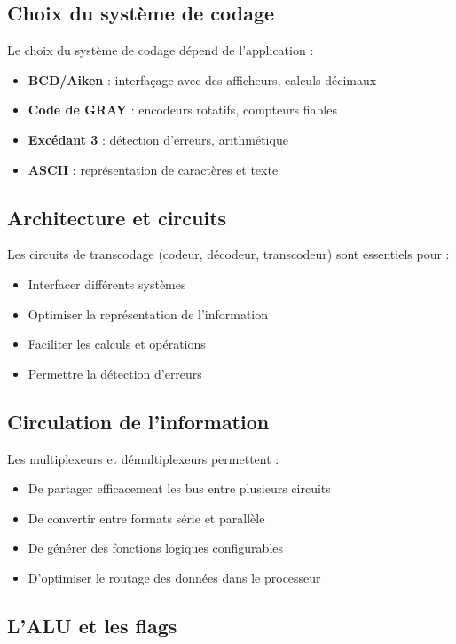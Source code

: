 \documentclass[a4paper,12pt]{article}
\begin{document}
\subsection{Choix du système de codage}

Le choix du système de codage dépend de l'application :
\begin{itemize}
    \item \textbf{BCD/Aiken} : interfaçage avec des afficheurs, calculs décimaux
    \item \textbf{Code de GRAY} : encodeurs rotatifs, compteurs fiables
    \item \textbf{Excédant 3} : détection d'erreurs, arithmétique
    \item \textbf{ASCII} : représentation de caractères et texte
\end{itemize}

\subsection{Architecture et circuits}

Les circuits de transcodage (codeur, décodeur, transcodeur) sont essentiels pour :
\begin{itemize}
    \item Interfacer différents systèmes
    \item Optimiser la représentation de l'information
    \item Faciliter les calculs et opérations
    \item Permettre la détection d'erreurs
\end{itemize}

\subsection{Circulation de l'information}

Les multiplexeurs et démultiplexeurs permettent :
\begin{itemize}
    \item De partager efficacement les bus entre plusieurs circuits
    \item De convertir entre formats série et parallèle
    \item De générer des fonctions logiques configurables
    \item D'optimiser le routage des données dans le processeur
\end{itemize}

\subsection{L'ALU et les flags}
\end{document}
